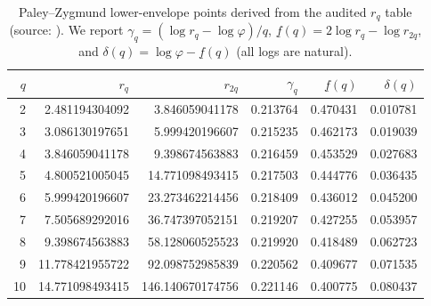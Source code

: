 \begin{table}[H]
\centering
\scriptsize
\setlength{\tabcolsep}{6pt}
\caption{Paley--Zygmund lower-envelope points derived from the audited $r_q$ table (source: \texttt{}). We report $\gamma_q=(\log r_q-\log\varphi)/q$, $\underline f(q)=2\log r_q-\log r_{2q}$, and $\delta(q)=\log\varphi-\underline f(q)$ (all logs are natural).}
\label{tab:fold_collision_multifractal_envelope_pz_q10}
\begin{tabular}{r r r r r r}
\toprule
$q$ & $r_q$ & $r_{2q}$ & $\gamma_q$ & $\underline f(q)$ & $\delta(q)$\\
\midrule
2 & 2.481194304092 & 3.846059041178 & 0.213764 & 0.470431 & 0.010781\\
3 & 3.086130197651 & 5.999420196607 & 0.215235 & 0.462173 & 0.019039\\
4 & 3.846059041178 & 9.398674563883 & 0.216459 & 0.453529 & 0.027683\\
5 & 4.800521005045 & 14.771098493415 & 0.217503 & 0.444776 & 0.036435\\
6 & 5.999420196607 & 23.273462214456 & 0.218409 & 0.436012 & 0.045200\\
7 & 7.505689292016 & 36.747397052151 & 0.219207 & 0.427255 & 0.053957\\
8 & 9.398674563883 & 58.128060525523 & 0.219920 & 0.418489 & 0.062723\\
9 & 11.778421955722 & 92.098752985839 & 0.220562 & 0.409677 & 0.071535\\
10 & 14.771098493415 & 146.140670174756 & 0.221146 & 0.400775 & 0.080437\\
\bottomrule
\end{tabular}
\end{table}
